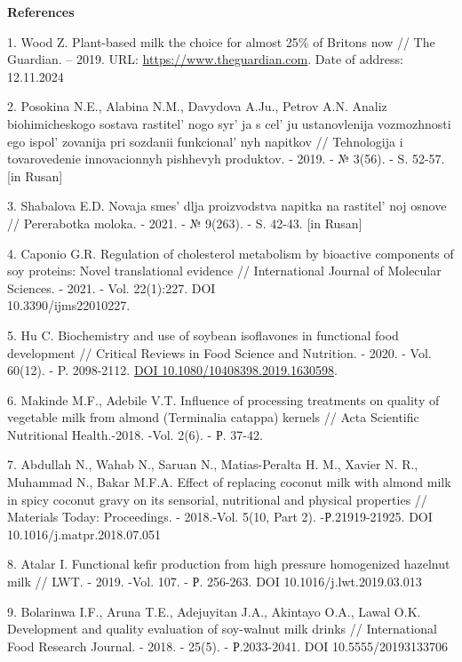 \begin{center}
{\bfseries References}
\end{center}

\begin{references}
1. Wood Z. Plant-based milk the choice for almost 25\% of Britons now //
The Guardian. -- 2019. URL:
\href{https://www.theguardian.com/food/2019/jul/19/plant-based-milk-the-choice-for-almost-25-of-britons-now}{https://www.theguardian.com}.
Date of address: 12.11.2024

2. Posokina N.E., Alabina N.M., Davydova A.Ju., Petrov A.N. Analiz
biohimicheskogo sostava rastitel' nogo
syr' ja s cel' ju ustanovlenija
vozmozhnosti ego ispol' zovanija pri sozdanii
funkcional' nyh napitkov // Tehnologija i tovarovedenie
innovacionnyh pishhevyh produktov. - 2019. - № 3(56). - S. 52-57. {[}in
Rusan{]}

3. Shabalova E.D. Novaja smes'{} dlja proizvodstva
napitka na rastitel' noj osnove // Pererabotka moloka. -
2021. - № 9(263). - S. 42-43. {[}in Rusan{]}

4. Caponio G.R. Regulation of cholesterol metabolism by bioactive
components of soy proteins: Novel translational evidence //
International Journal of Molecular Sciences. - 2021. - Vol. 22(1):227.
DOI \\10.3390/ijms22010227.

5. Hu C. Biochemistry and use of soybean isoflavones in functional food
development // Critical Reviews in Food Science and Nutrition. - 2020. -
Vol. 60(12). - P. 2098-2112.
\href{https://doi.org/10.1080/10408398.2019.1630598}{DOI
10.1080/10408398.2019.1630598}.

6. Makinde M.F., Adebile V.T. Influence of processing treatments on
quality of vegetable milk from almond (Terminalia catappa) kernels //
Acta Scientific Nutritional Health.-2018. -Vol. 2(6). - Р. 37-42.

7. Abdullah N., Wahab N., Saruan N., Matias-Peralta H. M., Xavier N. R.,
Muhammad N., Bakar M.F.A. Effect of replacing coconut milk with almond
milk in spicy coconut gravy on its sensorial, nutritional and physical
properties // Materials Today: Proceedings. - 2018.-Vol. 5(10, Part 2).
-Р.21919-21925. DOI 10.1016/j.matpr.2018.07.051

8. Atalar I. Functional kefir production from high pressure homogenized
hazelnut milk // LWT. - 2019. -Vol. 107. - Р. 256-263. DOI
10.1016/j.lwt.2019.03.013

9. Bolarinwa I.F., Aruna T.E., Adejuyitan J.A., Akintayo O.A., Lawal
O.K. Development and quality evaluation of soy-walnut milk drinks //
International Food Research Journal. - 2018. - 25(5). - Р.2033-2041. DOI
10.5555/20193133706


\end{references}
